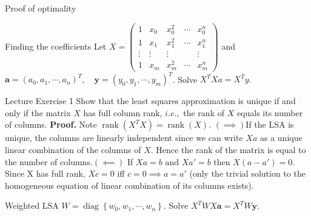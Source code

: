 \documentclass[10pt,landscape]{article}
\theoremstyle{definition}
\newcommand{\thistheoremname}{}
\newtheorem*{genericthm*}{\thistheoremname}
\newenvironment{namedthm*}[1]
{\renewcommand{\thistheoremname}{#1}\begin{genericthm*}}
{\end{genericthm*}}
\begin{document}
\begin{multicols}{3}
\begin{namedthm*}{Proof of optimality}
	\end{namedthm*}
	\begin{namedthm*}{Finding the coefficients}
		Let \(X=\left(\begin{array}{ccccc}{1} & {x_{0}} & {x_{0}^{2}} & {\cdots} & {x_{0}^{n}} \\ {1} & {x_{1}} & {x_{1}^{2}} & {\cdots} & {x_{1}^{n}} \\ {\vdots} & {\vdots} & {\vdots} & {} & {\vdots} \\ {1} & {x_{m}} & {x_{m}^{2}} & {\cdots} & {x_{m}^{n}}\end{array}\right)\) and
		\\ \(\mathbf{a}=\left(a_{0}, a_{1}, \cdots, a_{n}\right)^{T}, \quad \mathbf{y}=\left(y_{0}, y_{1}, \cdots, y_{m}\right)^{T}\). Solve \(X^TXa = X^Ty.\)
	\end{namedthm*}

	\begin{namedthm*}{Lecture Exercise 1} Show that the least squares approximation is unique if and only if the matrix \(X\)
		has full column rank, \(i.e.,\) the rank of \(X\) equals its number of columns. \textbf{Proof.} Note \(\operatorname{rank}(X^TX)=\operatorname{rank}(X)\). \((\implies)\)If the LSA is unique, the columns are linearly independent since we can write \(Xa\) as a unique linear combination of the columns of \(X\). Hence the rank of the matrix is equal to the number of columns.\((\impliedby)\) If \(Xa = b \text{ and } Xa' = b\) then \(X(a-a')=0\). Since X has full rank, \(Xc = 0\) iff \(c = 0 \implies a = a'\) (only the trivial solution to the homogeneous equation of linear combination of its columns exists).
	\end{namedthm*}
	\begin{namedthm*}{Weighted LSA}
		\(W=\operatorname{diag}\left\{w_{0}, w_{1}, \cdots, w_{n}\right\}\). Solve \(X^{T} W X \mathbf{a}=X^{T} W \mathbf{y}\).
	\end{namedthm*}

\end{multicols}
\end{document}
